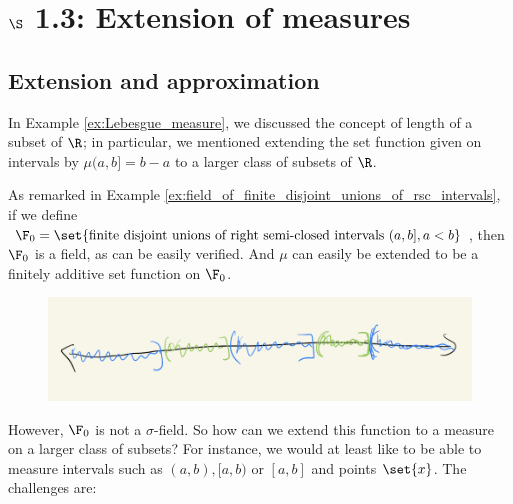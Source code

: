 \documentclass{article} %
\begin{document}
	







 \section{$\S$ 1.3: Extension of measures} \label{sec:extension_of_measures}
 
 
\subsection{Extension and approximation} \label{sec:extension_and_approximation}
 
In Example \ref{ex:Lebesgue_measure}, we discussed the concept of length of a subset of $\R$; in particular, we mentioned extending the set function given on intervals by $\mu(a,b] = b-a$ to a larger class of subsets of $\R$.  


 As remarked in Example \ref{ex:field_of_finite_disjoint_unions_of_rsc_intervals}, if we define $\F_0 = \set{\text{finite disjoint unions of right semi-closed intervals } (a,b], a < b}$, then $\F_0$ is a field, as can be easily verified.  And $\mu$ can easily be extended to be a finitely additive set function on $\F_0$.   

\begin{figure}[H]
\centering
\includegraphics[width=.6\textwidth]{images/rsc_intervals}	
\end{figure}

However, $\F_0$ is not a $\sigma$-field.   So how can we extend this function to a measure on a larger class of subsets?  For instance, we would at least like to be able to measure intervals such as $(a,b), [a,b)$ or $[a,b]$ and points $\set{x}$.   The challenges are:
\end{document}
